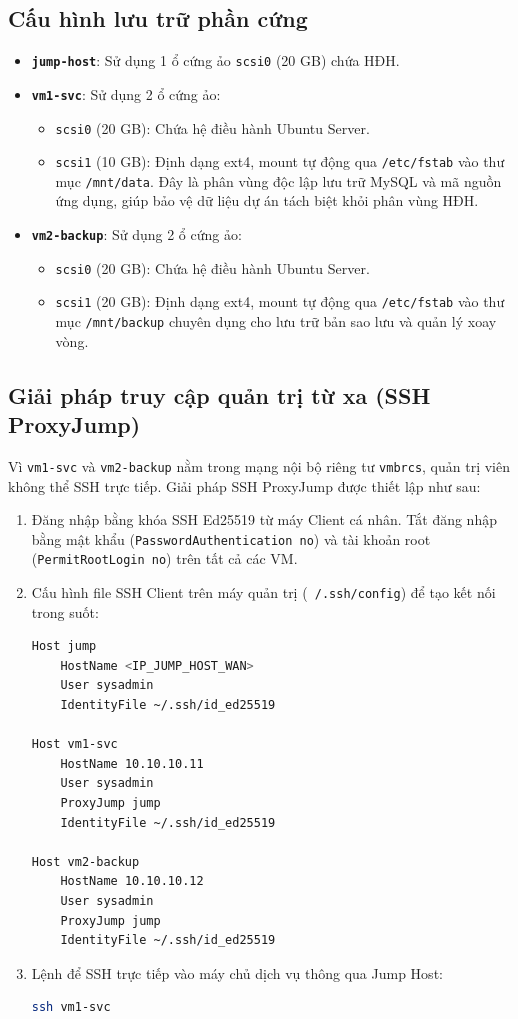\documentclass[a4paper,12pt]{article}
\begin{document}
\subsection{Cấu hình lưu trữ phần cứng}
\begin{itemize}
    \item \textbf{\texttt{jump-host}}: Sử dụng 1 ổ cứng ảo \texttt{scsi0} (20 GB) chứa HĐH.
    \item \textbf{\texttt{vm1-svc}}: Sử dụng 2 ổ cứng ảo:
    \begin{itemize}
        \item \texttt{scsi0} (20 GB): Chứa hệ điều hành Ubuntu Server.
        \item \texttt{scsi1} (10 GB): Định dạng ext4, mount tự động qua \texttt{/etc/fstab} vào thư mục \texttt{/mnt/data}. Đây là phân vùng độc lập lưu trữ MySQL và mã nguồn ứng dụng, giúp bảo vệ dữ liệu dự án tách biệt khỏi phân vùng HĐH.
    \end{itemize}
    \item \textbf{\texttt{vm2-backup}}: Sử dụng 2 ổ cứng ảo:
    \begin{itemize}
        \item \texttt{scsi0} (20 GB): Chứa hệ điều hành Ubuntu Server.
        \item \texttt{scsi1} (20 GB): Định dạng ext4, mount tự động qua \texttt{/etc/fstab} vào thư mục \texttt{/mnt/backup} chuyên dụng cho lưu trữ bản sao lưu và quản lý xoay vòng.
    \end{itemize}
\end{itemize}

\subsection{Giải pháp truy cập quản trị từ xa (SSH ProxyJump)}
Vì \texttt{vm1-svc} và \texttt{vm2-backup} nằm trong mạng nội bộ riêng tư \texttt{vmbrcs}, quản trị viên không thể SSH trực tiếp. Giải pháp SSH ProxyJump được thiết lập như sau:
\begin{enumerate}
    \item Đăng nhập bằng khóa SSH Ed25519 từ máy Client cá nhân. Tắt đăng nhập bằng mật khẩu (\texttt{PasswordAuthentication no}) và tài khoản root (\texttt{PermitRootLogin no}) trên tất cả các VM.
    \item Cấu hình file SSH Client trên máy quản trị (\texttt{~/.ssh/config}) để tạo kết nối trong suốt:
\begin{lstlisting}[language=bash]
Host jump
    HostName <IP_JUMP_HOST_WAN>
    User sysadmin
    IdentityFile ~/.ssh/id_ed25519

Host vm1-svc
    HostName 10.10.10.11
    User sysadmin
    ProxyJump jump
    IdentityFile ~/.ssh/id_ed25519

Host vm2-backup
    HostName 10.10.10.12
    User sysadmin
    ProxyJump jump
    IdentityFile ~/.ssh/id_ed25519
\end{lstlisting}
    \item Lệnh để SSH trực tiếp vào máy chủ dịch vụ thông qua Jump Host:
    \begin{lstlisting}[language=bash]
ssh vm1-svc
    \end{lstlisting}
\end{enumerate}
\end{document}
